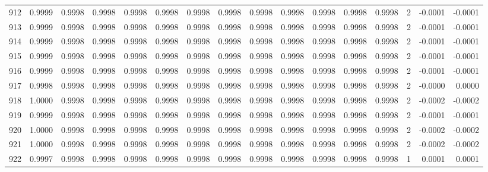 \begin{tabular}{lrrrrrrrrrrrrrrr}
912 &      0.9999 &  0.9998 &  0.9998 &  0.9998 &  0.9998 &  0.9998 &  0.9998 &  0.9998 &  0.9998 &  0.9998 &   0.9998 &     0.9998 &      2 &                   -0.0001 &                    -0.0001 \\
913 &      0.9999 &  0.9998 &  0.9998 &  0.9998 &  0.9998 &  0.9998 &  0.9998 &  0.9998 &  0.9998 &  0.9998 &   0.9998 &     0.9998 &      2 &                   -0.0001 &                    -0.0001 \\
914 &      0.9999 &  0.9998 &  0.9998 &  0.9998 &  0.9998 &  0.9998 &  0.9998 &  0.9998 &  0.9998 &  0.9998 &   0.9998 &     0.9998 &      2 &                   -0.0001 &                    -0.0001 \\
915 &      0.9999 &  0.9998 &  0.9998 &  0.9998 &  0.9998 &  0.9998 &  0.9998 &  0.9998 &  0.9998 &  0.9998 &   0.9998 &     0.9998 &      2 &                   -0.0001 &                    -0.0001 \\
916 &      0.9999 &  0.9998 &  0.9998 &  0.9998 &  0.9998 &  0.9998 &  0.9998 &  0.9998 &  0.9998 &  0.9998 &   0.9998 &     0.9998 &      2 &                   -0.0001 &                    -0.0001 \\
917 &      0.9998 &  0.9998 &  0.9998 &  0.9998 &  0.9998 &  0.9998 &  0.9998 &  0.9998 &  0.9998 &  0.9998 &   0.9998 &     0.9998 &      2 &                   -0.0000 &                     0.0000 \\
918 &      1.0000 &  0.9998 &  0.9998 &  0.9998 &  0.9998 &  0.9998 &  0.9998 &  0.9998 &  0.9998 &  0.9998 &   0.9998 &     0.9998 &      2 &                   -0.0002 &                    -0.0002 \\
919 &      0.9999 &  0.9998 &  0.9998 &  0.9998 &  0.9998 &  0.9998 &  0.9998 &  0.9998 &  0.9998 &  0.9998 &   0.9998 &     0.9998 &      2 &                   -0.0001 &                    -0.0001 \\
920 &      1.0000 &  0.9998 &  0.9998 &  0.9998 &  0.9998 &  0.9998 &  0.9998 &  0.9998 &  0.9998 &  0.9998 &   0.9998 &     0.9998 &      2 &                   -0.0002 &                    -0.0002 \\
921 &      1.0000 &  0.9998 &  0.9998 &  0.9998 &  0.9998 &  0.9998 &  0.9998 &  0.9998 &  0.9998 &  0.9998 &   0.9998 &     0.9998 &      2 &                   -0.0002 &                    -0.0002 \\
922 &      0.9997 &  0.9998 &  0.9998 &  0.9998 &  0.9998 &  0.9998 &  0.9998 &  0.9998 &  0.9998 &  0.9998 &   0.9998 &     0.9998 &      1 &                    0.0001 &                     0.0001 \\

\end{tabular}
